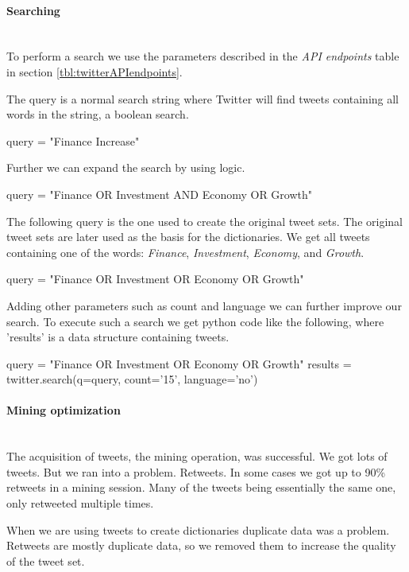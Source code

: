 \paragraph{Searching}
\hspace{0pt}\\
To perform a search we use the parameters described in the \textit{API
endpoints} table in section \ref{tbl:twitterAPIendpoints}.

The query is a normal search string where Twitter will
find tweets containing all words in the string, a boolean search. 
\begin{python}
query = "Finance Increase"
\end{python}

Further we can expand the search by using logic. 
\begin{python}
query = "Finance OR Investment AND Economy OR Growth"
\end{python}

The following query is the one used to create the original tweet sets. The
original tweet sets are later used as the basis for the dictionaries.
We get all tweets containing one of the words: \textit{Finance}, \textit{Investment}, \textit{Economy}, and \textit{Growth}.
\begin{python}
query = "Finance OR Investment OR Economy OR Growth"
\end{python}

Adding other parameters such as count and language we can further improve our
search. To execute such a search we get python code like the following, where
'results' is a data structure containing tweets.
\begin{python}
query = "Finance OR Investment OR Economy OR Growth"
results = twitter.search(q=query, count='15', language='no')
\end{python}
%

\paragraph{Mining optimization}
\hspace{0pt}\\
The acquisition of tweets, the mining operation, was successful. We got lots
of tweets. But we ran into a problem. Retweets. In some cases we got up to 90\%
retweets in a mining session. Many of the tweets being essentially the same
one, only retweeted multiple times. 

When we are using tweets to create dictionaries duplicate data was a problem.
Retweets are mostly duplicate data, so we removed them to increase the quality
of the tweet set.

